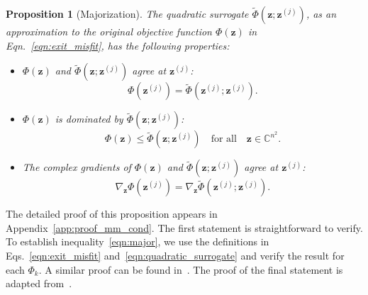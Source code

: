 \documentclass{article}
\numberwithin{equation}{section}
\newtheorem{proposition}[theorem]{Proposition}
\begin{document}
\begin{proposition}[Majorization]\label{prop:mm_cond}
    The quadratic surrogate $\widetilde{\Phi}\left(\bm{z} ; \bm{z}^{(j)}\right)$, as an approximation to the original objective function $\Phi(\bm{z})$ in~ Eqn.~\eqref{eqn:exit_misfit}, has the following properties:
\begin{itemize}
    \item $\Phi(\bm{z})$ and $\widetilde{\Phi}\left(\bm{z} ; \bm{z}^{(j)}\right)$ agree at $\bm{z}^{(j)}$:
    \begin{equation*}
        \Phi\left(\bm{z}^{(j)}\right) = \widetilde{\Phi}\left(\bm{z}^{(j)} ; \bm{z}^{(j)}\right).
    \end{equation*}
    \item $\Phi(\bm{z})$ is dominated by $\widetilde{\Phi}\left(\bm{z} ; \bm{z}^{(j)}\right)$:
    \begin{equation}\label{eqn:major}
        \Phi\left(\bm{z}\right) \leq \widetilde{\Phi}\left(\bm{z} ; \bm{z}^{(j)}\right)\quad\text{for all}\quad\bm{z}\in\mathbb{C}^{n^2}.
    \end{equation}
    \item The complex gradients of $\Phi(\bm{z})$ and $\widetilde{\Phi}\left(\bm{z} ; \bm{z}^{(j)}\right)$ agree at $\bm{z}^{(j)}$:
    \begin{equation*} 
        \nabla_{\bm{z}}\Phi\left(\bm{z}^{(j)}\right) = \nabla_{\bm{z}}\widetilde{\Phi}\left(\bm{z}^{(j)} ; \bm{z}^{(j)}\right).
    \end{equation*}
\end{itemize}
\end{proposition}
The detailed proof of this proposition appears in Appendix~\ref{app:proof_mm_cond}. The first statement is straightforward to verify. To establish inequality~\eqref{eqn:major}, we use the definitions in Eqs.~\eqref{eqn:exit_misfit} and~\eqref{eqn:quadratic_surrogate} and verify the result for each $\Phi_k$. A similar proof can be found in~\cite{MM_phaseretrieval}. The proof of the final statement is adapted from~\cite{mm_convergence}.
\end{document}
